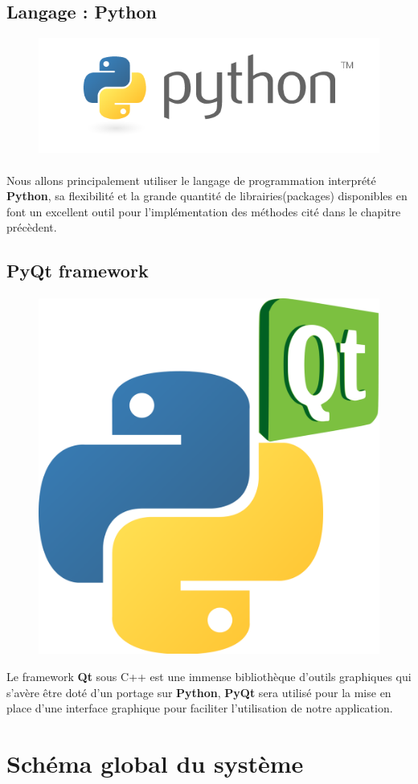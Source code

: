 \documentclass[12pt]{report}
\begin{document}
		\subsection{Langage : Python}
		\begin{figure}[H]
			\centering
			\includegraphics[width=0.55\linewidth]{images/python.png}
		\end{figure}
		\paragraph{}
		Nous allons principalement utiliser le langage de programmation interprété \textbf{Python}, sa 
		flexibilité et la grande quantité de librairies(packages) disponibles en font un excellent
		outil pour l'implémentation des méthodes cité dans le chapitre précèdent.
		
		\subsection{PyQt framework}
		\paragraph{}
		\begin{figure}[H]
			\centering
			\includegraphics[width=0.25\linewidth]{images/pyQt.png}
		\end{figure}
		Le framework \textbf{Qt} sous C++ est une immense bibliothèque d'outils graphiques qui s'avère
		être doté d'un portage sur \textbf{Python}, \textbf{PyQt} sera utilisé pour la mise en place
		d'une interface graphique pour faciliter l'utilisation de notre application.
	\section{Schéma global du système}
\end{document}

